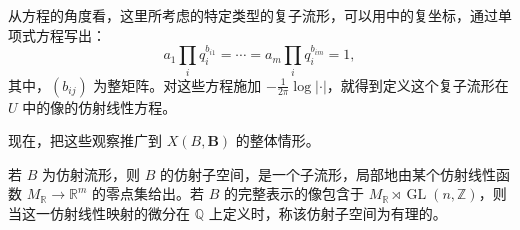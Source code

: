 \begin{note}[numbered]\label{note:6.52}
从方程的角度看，这里所考虑的特定类型的复子流形，可以用中的复坐标，通过单项式方程写出：
\[
a_1\prod_iq_i^{b_{i1}}=\cdots=a_m\prod_iq_i^{b_{im}}=1,
\]
其中，$(b_{ij})$ 为整矩阵。对这些方程施加 $-\frac1{2\pi}\log|\cdot|$，就得到定义这个复子流形在 $U$ 中的像的仿射线性方程。
\end{note}

现在，把这些观察推广到 $X(B,\mathbf B)$ 的整体情形。

\begin{definition}\label{def:6.53}
若 $B$ 为仿射流形，则 $B$ 的仿射子空间，是一个子流形，局部地由某个仿射线性函数 $M_{\mathbb R}\to\mathbb R^m$ 的零点集给出。若 $B$ 的完整表示的像包含于 $M_{\mathbb R}\rtimes\operatorname{GL}(n,\mathbb Z)$，则当这一仿射线性映射的微分在 $\mathbb Q$ 上定义时，称该仿射子空间为有理的。
\end{definition}

